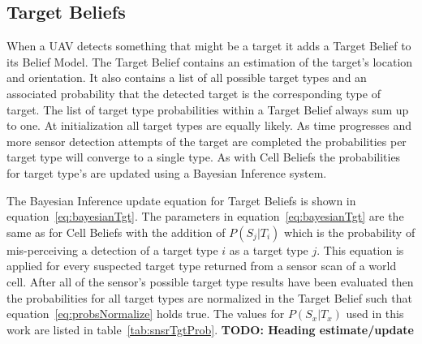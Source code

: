 \begin{multicols*}{2}
\subsection{Target Beliefs}
When a UAV detects something that might be a target it adds a Target Belief to its Belief Model.  The Target Belief contains an estimation of the target's location and orientation.  It also contains a list of all possible target types and an associated probability that the detected target is the corresponding type of target. The list of target type probabilities within a Target Belief always sum up to one.  At initialization all target types are equally likely.  As time progresses and more sensor detection attempts of the target are completed the probabilities per target type will converge to a single type.  As with Cell Beliefs the probabilities for target type's are updated using a Bayesian Inference system.  

The Bayesian Inference update equation for Target Beliefs is shown in equation~\ref{eq:bayesianTgt}.  The parameters in equation~\ref{eq:bayesianTgt} are the same as for Cell Beliefs with the addition of $P(S_{j}|T_{i})$ which is the probability of mis-perceiving a detection of a target type $i$ as a target type $j$.  This equation is applied for every suspected target type returned from a sensor scan of a world cell. After all of the sensor's possible target type results have been evaluated then the probabilities for all target types are normalized in the Target Belief such that equation~\ref{eq:probsNormalize} holds true.  The values for $P(S_{x}|T_{x})$ used in this work are listed in table~\ref{tab:snsrTgtProb}. \textbf{TODO: Heading estimate/update}




\end{multicols*}
